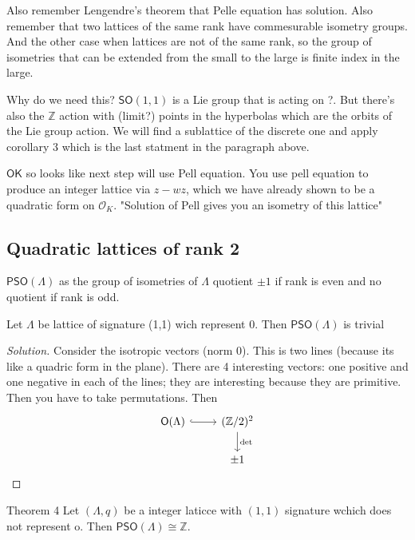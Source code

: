 Also remember Lengendre's theorem that Pelle equation has solution. Also remember that two lattices of the same rank have commesurable isometry groups. And the other case when lattices are not of the same rank, so the group of isometries that can be extended from the small to the large is finite index in the large.

Why do we need this? $\mathsf{SO}(1,1)$ is a Lie group that is acting on ?. But there's also the $\mathbb{Z}$ action with (limit?) points in the hyperbolas which are the orbits of the Lie group action. We will find a sublattice of the discrete one and apply corollary 3 which is the last statment in the paragraph above.

$\mathsf{OK}$ so looks like next step will use Pell equation. You use pell equation to produce an integer lattice via $z-wz$, which we have already shown to be a quadratic form on $\mathcal{O}_K$. {\color{4}"Solution of Pell gives you an isometry of this lattice"}

\subsection{Quadratic lattices of rank 2}

\begin{defn}\leavevmode
	$\mathsf{PSO}(\Lambda)$ as the group of isometries of $\Lambda$ quotient $\pm 1$ if rank is even and no quotient if rank is odd.
\end{defn}

\begin{exercise}\leavevmode
	Let $\Lambda$ be lattice of signature (1,1) wich represent 0. Then $\mathsf{PSO}(\Lambda)$ is trivial
\end{exercise}
\begin{proof}[Solution]\leavevmode
	Consider the isotropic vectors (norm 0). This is two lines (because its like a quadric form in the plane).  There are 4 interesting vectors: one positive and one negative in each of the lines; they are interesting because they are primitive. Then you have to take permutations. Then
	\[\begin{tikzcd}
		\mathsf{O}(\Lambda)\arrow[r,hook]&(\mathbb{Z}/2)^2\arrow[d,"\det "]\\
		& \pm 1
	\end{tikzcd}\]
\end{proof}

\begin{idea6}{Theorem 4}\leavevmode
	Let $(\Lambda,q)$ be a integer laticce with $(1,1)$ signature wchich does not represent o. Then  $\mathsf{PSO}(\Lambda) \cong \mathbb{Z}$.
\end{idea6}

